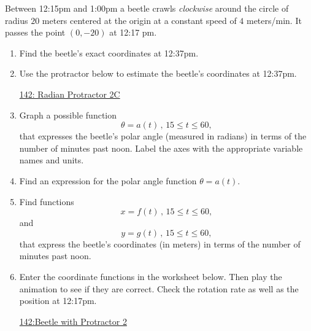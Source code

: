 \documentclass{ximera}
\begin{document}
\begin{question}  \label{Q9hhhhhhg94tf4}

Between 12:15pm and 1:00pm a beetle crawls \emph{clockwise} around the circle of radius $20$ meters centered at the origin at a constant speed of $4$ meters/min. It passes the point $(0,-20)$ at 12:17 pm.

\begin{enumerate}

\item Find the beetle's exact coordinates at 12:37pm.

\item Use the protractor below to estimate the beetle's coordinates at 12:37pm. 

\begin{onlineOnly}
    \begin{center}
\end{center}
\end{onlineOnly}

\href{https://www.desmos.com/calculator/lbkveixdno}{142: Radian Protractor 2C}


\item Graph a possible function
\[
 \theta = a(t) \, , \, 15\leq t \leq 60 ,
\]
that expresses the beetle's polar angle (measured in radians) in terms of the number of minutes past noon. Label the axes with the appropriate variable names and units.

\item Find an expression for the polar angle function $\theta = a(t)$.

\item Find functions
\[
     x = f(t) \, , \, 15 \leq t \leq 60,
\]
and
\[
     y = g(t) \, , \, 15 \leq t \leq 60,
\]
that express the beetle's coordinates (in meters) in terms of the number of minutes past noon.

\item Enter the coordinate functions in the worksheet below. Then play the animation to see if they are correct. Check the rotation rate as well as the position at 12:17pm.

\begin{onlineOnly}
    \begin{center}
\end{center}
\end{onlineOnly}

\href{https://www.desmos.com/calculator/u2c21q9zj4}{142:Beetle with Protractor 2}
\end{enumerate}

\end{question}
\end{document}
